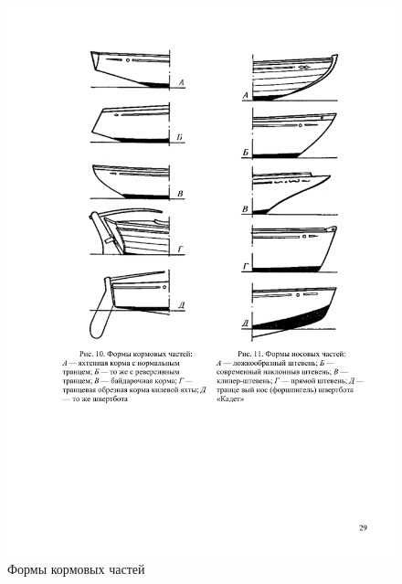 \documentclass[a4paper, 12pt, twoside, final]{scrbook}
\begin{document}
\begin{figure}[htbp]
	\begin{minipage}[b]{0.49\textwidth}
		\centering\includegraphics{Formy_korma}
		\caption{Формы кормовых частей}
		\label{fig:10}
	\end{minipage}
	\hfil\hfil%
	\begin{minipage}[b]{0.49\textwidth}

\end{minipage}
\end{figure}
\end{document}
